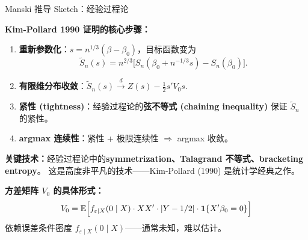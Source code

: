 \documentclass[aspectratio=169, 10pt]{beamer}
\begin{document}
\begin{frame}{Manski 推导 Sketch：经验过程论}

  \textbf{Kim-Pollard 1990 证明的核心步骤：}

  \begin{enumerate}\setlength{\itemsep}{2pt}
    \item \textbf{重新参数化}：$s = n^{1/3}(\beta - \beta_0)$，目标函数变为
    $$\tilde S_n(s) = n^{2/3}\bigl[S_n(\beta_0 + n^{-1/3} s) - S_n(\beta_0)\bigr].$$

    \item \textbf{有限维分布收敛}：$\tilde S_n(s) \overset{d}{\to} Z(s) - \tfrac{1}{2} s' V_0 s$.

    \item \textbf{紧性 (tightness)}：经验过程论的\textbf{弦不等式 (chaining inequality)} 保证 $\tilde S_n$ 的紧性。

    \item \textbf{argmax 连续性}：紧性 + 极限连续性 $\Rightarrow$ argmax 收敛。
  \end{enumerate}

  \begin{highlightbox}
    \textbf{关键技术：}经验过程论中的\textbf{symmetrization、Talagrand 不等式、bracketing entropy}。
    这是高度非平凡的技术——Kim-Pollard (1990) 是统计学经典之作。
  \end{highlightbox}

  \begin{keybox}
    \textbf{方差矩阵 $V_0$ 的具体形式：}
    $$V_0 = \mathbb{E}\Bigl[f_{\varepsilon\mid X}(0\mid X) \cdot X X' \cdot |Y - 1/2| \cdot \mathbf{1}\{X'\beta_0 = 0\}\Bigr]$$
    依赖误差条件密度 $f_{\varepsilon\mid X}(0\mid X)$——通常未知，难以估计。
  \end{keybox}

\end{frame}
\end{document}
